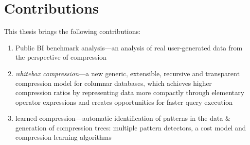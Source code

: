 \newpage
\section{Contributions}

This thesis brings the following contributions:
\begin{enumerate}[1)]
\item Public BI benchmark analysis---an analysis of real user-generated data from the perspective of compression
\item \textit{whitebox compression}---a new generic, extensible, recursive and transparent compression model for columnar databases, which achieves higher compression ratios by representing data more compactly through elementary operator expressions and creates opportunities for faster query execution
\item learned compression---automatic identification of patterns in the data \& generation of compression trees: multiple pattern detectors, a cost model and compression learning algorithms
\end{enumerate}






